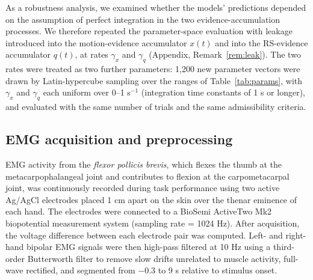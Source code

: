 \documentclass[a4paper,11pt]{article}
\theoremstyle{definition}
\newcommand{\1}{\mathbbm{1}}
\begin{document}
As a robustness analysis, we examined whether the models' predictions depended on the assumption of perfect integration in the two evidence-accumulation processes. We therefore repeated the parameter-space evaluation with leakage introduced into the motion-evidence accumulator $x(t)$ and into the RS-evidence accumulator $q(t)$, at rates $\gamma_{x}$ and $\gamma_{q}$ (Appendix, Remark~\ref{rem:leak}). The two rates were treated as two further parameters: 1,200 new parameter vectors were drawn by Latin-hypercube sampling over the ranges of Table~\ref{tab:params}, with $\gamma_{x}$ and $\gamma_{q}$ each uniform over 0--1 s$^{-1}$ (integration time constants of 1 s or longer), and evaluated with the same number of trials and the same admissibility criteria.


\subsection{EMG acquisition and preprocessing}

EMG activity from the \emph{flexor pollicis brevis}, which flexes the thumb at the metacarpophalangeal joint and contributes to flexion at the carpometacarpal joint, was continuously recorded during task performance using two active Ag/AgCl electrodes placed 1 cm apart on the skin over the thenar eminence of each hand. The electrodes were connected to a BioSemi ActiveTwo Mk2 biopotential measurement system (sampling rate = 1024 Hz). After acquisition, the voltage difference between each electrode pair was computed. Left- and right-hand bipolar EMG signals were then high-pass filtered at 10 Hz using a third-order Butterworth filter to remove slow drifts unrelated to muscle activity, full-wave rectified, and segmented from $-$0.3 to 9 s relative to stimulus onset.
\end{document}
